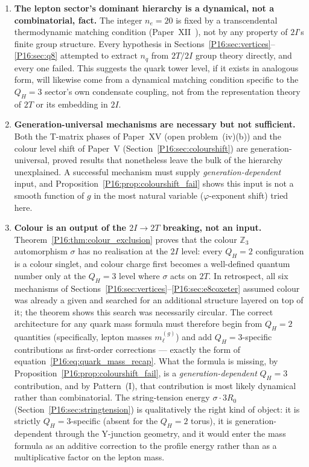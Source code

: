 \documentclass[11pt,a4paper]{article}
\theoremstyle{definition}\newtheorem{definition}[theorem]{Definition}
\theoremstyle{remark}
\theoremstyle{definition}\newtheorem{construction}[theorem]{Construction}
\newcommand{\vp}{\varphi}
\newcommand{\twoI}{2I}
\newcommand{\twoT}{2T}
\newcommand{\QH}{Q_H}
\begin{document}
\begin{enumerate}[label=(\Roman*)]
\item \textbf{The lepton sector's dominant hierarchy is a dynamical,
  not a combinatorial, fact.} The integer $n_e=20$ is fixed by a
  transcendental thermodynamic matching condition
  (Paper~XII~\cite{Paper12}), not by any property of $\twoI$'s finite
  group structure. Every hypothesis in
  Sections~\ref{P16:sec:vertices}--\ref{P16:sec:q8} attempted to extract $n_q$
  from $\twoT/\twoI$ group theory directly, and every one failed. This
  suggests the quark tower level, if it exists in analogous form,
  will likewise come from a dynamical matching condition specific to
  the $\QH=3$ sector's own condensate coupling, not from the
  representation theory of $\twoT$ or its embedding in $\twoI$.
\item \textbf{Generation-universal mechanisms are necessary but not
  sufficient.} Both the T-matrix phases of Paper~XV (open
  problem~(iv)(b)) and the colour level shift of Paper~V
  (Section~\ref{P16:sec:colourshift}) are generation-universal,
  proved results that nonetheless leave the bulk of the hierarchy
  unexplained. A successful mechanism must supply
  \emph{generation-dependent} input, and Proposition~\ref{P16:prop:colourshift_fail}
  shows this input is not a smooth function of $g$ in the most natural
  variable ($\vp$-exponent shift) tried here.
\item \textbf{Colour is an output of the $\twoI\to\twoT$ breaking, not
  an input.} Theorem~\ref{P16:thm:colour_exclusion} proves that the colour
  $\mathbb{Z}_3$ automorphism $\sigma$ has no realisation at the
  $\twoI$ level: every $\QH=2$ configuration is a colour singlet, and
  colour charge first becomes a well-defined quantum number only at the
  $\QH=3$ level where $\sigma$ acts on $\twoT$.  In retrospect, all
  six mechanisms of Sections~\ref{P16:sec:vertices}--\ref{P16:sec:e8coxeter}
  assumed colour was already a given and searched for an additional
  structure layered on top of it; the theorem shows this search was
  necessarily circular.  The correct architecture for any quark mass
  formula must therefore begin from $\QH=2$ quantities (specifically,
  lepton masses $m_\ell^{(g)}$) and add $\QH=3$-specific contributions
  as first-order corrections --- exactly the form of
  equation~\eqref{P16:eq:quark_mass_recap}.  What the formula is missing,
  by Proposition~\ref{P16:prop:colourshift_fail}, is a
  \emph{generation-dependent} $\QH=3$ contribution, and by
  Pattern~(I), that contribution is most likely dynamical rather than
  combinatorial.  The string-tension energy $\sigma\cdot3R_0$
  (Section~\ref{P16:sec:stringtension}) is qualitatively the right kind of
  object: it is strictly $\QH=3$-specific (absent for the $\QH=2$
  torus), it is generation-dependent through the Y-junction geometry,
  and it would enter the mass formula as an additive correction to the
  profile energy rather than as a multiplicative factor on the lepton
  mass.
\end{enumerate}
\end{document}
